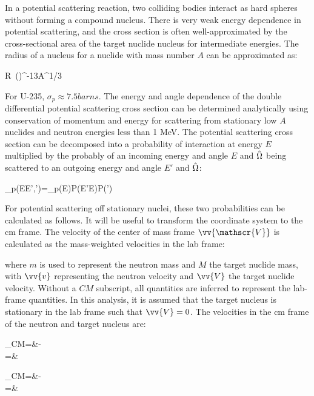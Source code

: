 In a potential scattering reaction, two colliding bodies interact as hard spheres without forming a compound nucleus. There is very weak energy dependence in potential scattering, and the cross section is often well-approximated by the cross-sectional area of the target nuclide nucleus for intermediate energies. The radius of a nucleus for a nuclide with mass number \(A\) can be approximated as:

\beq
R\ ()^{-13}A^{1/3}
\eeq

For U-235, \(\sigma_p\approx7.5 barns\). The energy and angle dependence of the double differential potential scattering cross section can be determined analytically using conservation of momentum and energy for scattering from stationary low \(A\) nuclides and neutron energies less than 1 MeV. The potential scattering cross section can be decomposed into a probability of interaction at energy \(E\) multiplied by the probably of an incoming energy and angle \(E\) and \(\hat{\Omega}\) being scattered to an outgoing energy and angle \(E'\) and \(\hat{\Omega}\):

\beq
\label{eq:DifferentialSigma}
\sigma_p(E\rightarrow E',\hO\rightarrow\hO')=\sigma_p(E)P(E'\rightarrow E)P(\hO\rightarrow\hO')
\eeq


\label{sec:PotentialStationary}
For potential scattering off stationary nuclei, these two probabilities can be calculated as follows. It will be useful to transform the coordinate system to the \gls{cm} frame. The velocity of the center of mass frame \(\vv{\mathscr{V}}\) is calculated as the mass-weighted velocities in the lab frame:

\beq
\label{eq:CMVelocity}
\equiv{}
\eeq

where \(m\) is used to represent the neutron mass and \(M\) the target nuclide mass, with \(\vv{v}\) representing the neutron velocity and \(\vv{V}\) the target nuclide velocity. Without a \(CM\) subscript, all quantities are inferred to represent the lab-frame quantities. In this analysis, it is assumed that the target nucleus is stationary in the lab frame such that \(\vv{V}=0\). The velocities in the \gls{cm} frame of the neutron and target nucleus are:

\beqa
\label{eq:CMVelocities}
_{CM}=&-\\
=&
\eeqa

\beqa
\label{eq:CMVelocities2}
_{CM}=&-\\
=&
\eeqa

